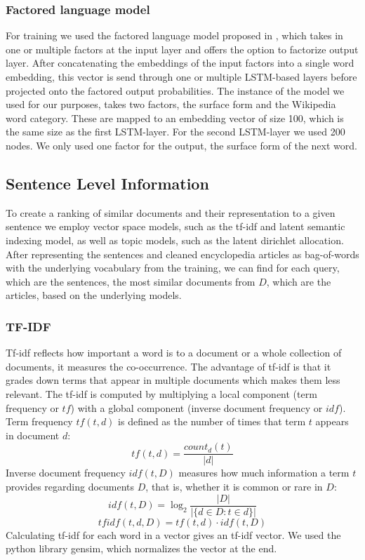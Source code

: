 \documentclass[a4paper]{article}
\begin{document}
\subsubsection{Factored language model}
For training we used the factored language model proposed in \cite{niehuesusing}, which takes in one or multiple factors at the input layer and offers the option to factorize output layer. After concatenating the embeddings of the input factors into a single word embedding, this vector is send through one or multiple LSTM-based layers before projected onto the factored output probabilities. The instance of the model we used for our purposes, takes two factors, the surface form and the Wikipedia word category. These are mapped to an embedding vector of size 100, which is the same size as the first LSTM-layer. For the second LSTM-layer we used 200 nodes. We only used one factor for the output, the surface form of the next word.


\subsection{Sentence Level Information} \label{sec:sentence-level}
To create a ranking of similar documents and their representation to a given sentence we employ vector space models, such as the tf-idf and latent semantic indexing model, as well as topic models, such as the latent dirichlet allocation. After representing the sentences and cleaned encyclopedia articles as bag-of-words with the underlying vocabulary from the training, we can find for each query, which are the sentences, the most similar documents from $D$, which are the articles,  based on the underlying models.

\subsubsection{TF-IDF}
Tf-idf \cite{salton1986introduction} reflects how important a word is to a document or a whole collection of documents, it measures the co-occurrence. The advantage of tf-idf is that it grades down terms that appear in multiple documents which makes them less relevant.
The tf-idf is computed by multiplying a local component (term frequency or $tf$) with a global component (inverse document frequency or $idf$). Term frequency $tf(t, d)$ is defined as the number of times that term $t$ appears in document $d$:
\begin{equation} 
tf(t,d)=\dfrac{count_d(t)}{|d|}
\end{equation}
Inverse document frequency $idf(t, D)$ measures how much information a term $t$ provides regarding documents $D$, that is, whether it is common or rare in $D$:
\begin{equation}
idf(t,D)= \log_2{ \dfrac{|D|}{|\{d \in D: t \in d\}|}}
\end{equation}
\begin{equation}
tfidf(t, d, D) = tf(t,d) \cdot idf(t,D)
\end{equation}
Calculating tf-idf for each word in a vector gives an tf-idf vector. We used the python library gensim, which normalizes the vector at the end.
\end{document}
